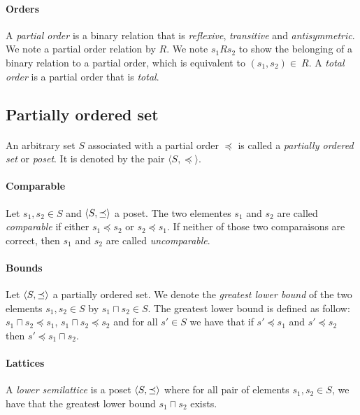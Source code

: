 \documentclass[letterpaper]{article}
\DeclarePairedDelimiter{\tuple}{\langle}{\rangle}
\begin{document}
\paragraph{Orders}

A \textit{partial order} is a binary relation that is \textit{reflexive},
\textit{transitive} and \textit{antisymmetric}. We note a
partial order relation by $R$.
We note $s_1 R  s_2$ to show the belonging of
a binary relation to a partial order, which is equivalent
to $(s_1, s_2) \in \ R$.
A \textit{total order} is a partial order that is \textit{total}.

\subsection{Partially ordered set}

\paragraph{}

An arbitrary set $S$ associated with a partial order $\preceq$
is called a \textit{partially ordered set} or \textit{poset}.
It is denoted by the pair $\langle S, \preceq \rangle$.

\paragraph{Comparable}

Let $s_1, s_2 \in S$ and $\tuple{S, \preceq}$ a poset.
The two elementes $s_1$ and $s_2$ are called \textit{comparable} if either
$s_1 \preceq s_2$ or $s_2 \preceq s_1$. If neither of those two comparaisons
are correct, then $s_1$ and $s_2$ are called \textit{uncomparable}.


\paragraph{Bounds} Let $\tuple{S, \preceq}$ a partially ordered set.
We denote the \textit{greatest lower bound} of the two elements $s_1, s_2 \in S$
by $s_1 \sqcap s_2 \in S$.
The greatest lower bound is defined as follow:
$s_1 \sqcap s_2 \preceq s_1$,
$s_1 \sqcap s_2 \preceq s_2$ and for all $s' \in S$ we have that
if $s' \preceq s_1$ and $s' \preceq s_2$ then $s' \preceq s_1 \sqcap s_2$.


\paragraph{Lattices} A \textit{lower semilattice} is a poset
$\tuple{S, \preceq}$ where for all pair of elements $s_1, s_2 \in S$,
we have that the greatest lower bound $s_1 \sqcap s_2$ exists.
\end{document}
